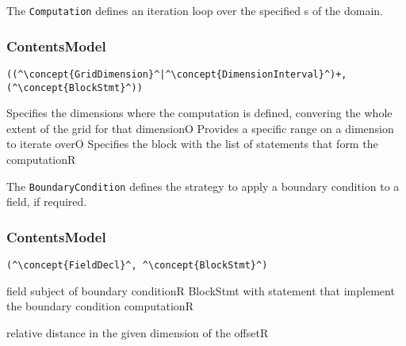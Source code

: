 The {\tt Computation} defines an iteration loop over the specified s of the domain.

\subsubsection*{ContentsModel}{}

\begin{lstlisting}[style=default,frame=none]
((^\concept{GridDimension}^|^\concept{DimensionInterval}^)+,(^\concept{BlockStmt}^))
\end{lstlisting}

\begin{HIRChildElements}
	{Specifies the dimensions where the computation is defined,
		convering the whole extent of the grid for that dimension}{O}
	{Provides a specific range on a dimension to iterate over}{O}
	{Specifies the block with the list of statements that form the computation}{R}
\end{HIRChildElements}


The {\tt BoundaryCondition} defines the strategy to apply a boundary condition to a field, if required.

\subsubsection*{ContentsModel}{}

\begin{lstlisting}[style=default,frame=none]
(^\concept{FieldDecl}^, ^\concept{BlockStmt}^)
\end{lstlisting}

\begin{HIRChildElements}
	{field subject of boundary condition}{R}
	{BlockStmt with statement that implement the boundary condition computation}{R}
\end{HIRChildElements}

\begin{HIRAttributes}
	{relative distance in the given dimension of the offset}{R}
\end{HIRAttributes}
